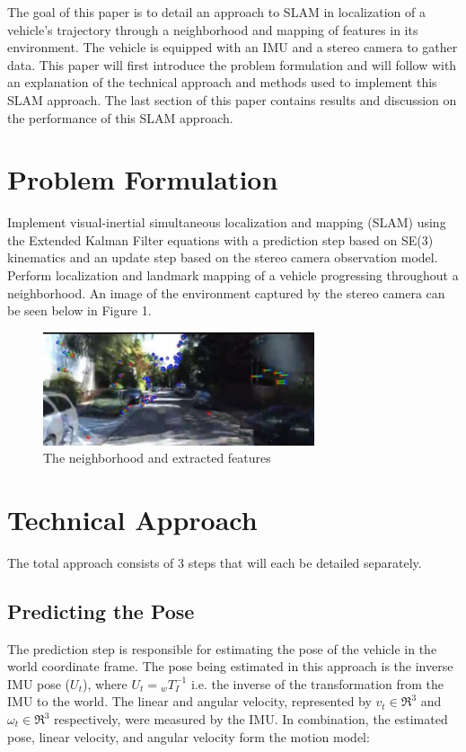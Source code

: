 \documentclass[conference]{IEEEtran}
\begin{document}
The goal of this paper is to detail an approach to SLAM in localization of a vehicle's trajectory through a neighborhood and mapping of features in its environment. The vehicle is equipped with an IMU and a stereo camera to gather data. This paper will first introduce the problem formulation and will follow with an explanation of the technical approach and methods used to implement this SLAM approach. The last section of this paper contains results and discussion on the performance of this SLAM approach. 


\section{Problem Formulation}


Implement visual-inertial simultaneous localization and mapping (SLAM) using the Extended Kalman Filter equations with a prediction step based on SE(3) kinematics
and an update step based on the stereo camera observation model. Perform localization and landmark mapping of a vehicle progressing throughout a neighborhood. An image of the environment captured by the stereo camera can be seen below in Figure 1. 

\begin{figure}[H]
\centerline{\includegraphics[width=80mm]{neighborhood.jpg}}
\caption{The neighborhood and extracted features }
\end{figure} 


\section{Technical Approach}

The total approach consists of 3 steps that will each be detailed separately. 

\subsection{Predicting the Pose}
The prediction step is responsible for estimating the pose of the vehicle in the world coordinate frame. The pose being estimated in this approach is the inverse IMU pose ($ U_{t}$), where $ U_{t} = {}_{w}{T}_{I}^{-1}$ i.e. the inverse of the transformation from the IMU to the world. The linear and angular velocity, represented by $v_{t} \in \Re^{3}$ and $\omega_{t} \in \Re^{3}$ respectively, were measured by the IMU. In combination, the estimated pose, linear velocity, and angular velocity form the motion model: 
\end{document}
